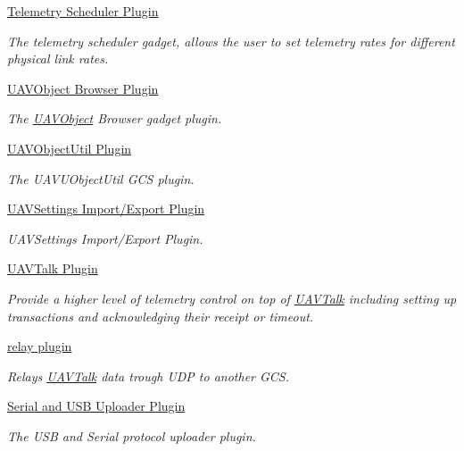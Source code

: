 \begin{DoxyCompactItemize}
\hyperlink{group___telemetry_scheduler}{\-Telemetry Scheduler Plugin}
\begin{DoxyCompactList}\small\item\em \-The telemetry scheduler gadget, allows the user to set telemetry rates for different physical link rates. \end{DoxyCompactList}\item 
\hyperlink{group___u_a_v_object_browser_plugin}{\-U\-A\-V\-Object Browser Plugin}
\begin{DoxyCompactList}\small\item\em \-The \hyperlink{class_u_a_v_object}{\-U\-A\-V\-Object} \-Browser gadget plugin. \end{DoxyCompactList}\item 
\hyperlink{group___u_a_v_object_util_plugin}{\-U\-A\-V\-Object\-Util Plugin}
\begin{DoxyCompactList}\small\item\em \-The \-U\-A\-V\-U\-Object\-Util \-G\-C\-S plugin. \end{DoxyCompactList}\item 
\hyperlink{group___u_a_v_settings_import_export}{\-U\-A\-V\-Settings Import/\-Export Plugin}
\begin{DoxyCompactList}\small\item\em \-U\-A\-V\-Settings \-Import/\-Export \-Plugin. \end{DoxyCompactList}\item 
\hyperlink{group___u_a_v_talk_plugin}{\-U\-A\-V\-Talk Plugin}
\begin{DoxyCompactList}\small\item\em \-Provide a higher level of telemetry control on top of \hyperlink{class_u_a_v_talk}{\-U\-A\-V\-Talk} including setting up transactions and acknowledging their receipt or timeout. \end{DoxyCompactList}\item 
\hyperlink{group___u_a_v_talk}{relay plugin}
\begin{DoxyCompactList}\small\item\em \-Relays \hyperlink{class_u_a_v_talk}{\-U\-A\-V\-Talk} data trough \-U\-D\-P to another \-G\-C\-S. \end{DoxyCompactList}\item 
\hyperlink{group___uploader}{\-Serial and U\-S\-B Uploader Plugin}
\begin{DoxyCompactList}\small\item\em \-The \-U\-S\-B and \-Serial protocol uploader plugin. \end{DoxyCompactList}\item 

\end{DoxyCompactItemize}
